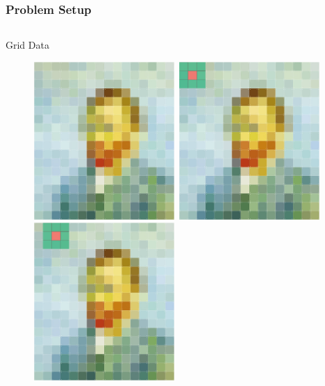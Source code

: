 \documentclass[aspectratio=169]{beamer}
\begin{document}
\begin{frame}[t]
    \frametitle{Problem Setup}
    \begin{columns} %
        \begin{column}{.48\textwidth}
            \begin{minipage}[c][.9\textheight][c]{.98\textwidth}
                \begin{center}    
                    \vskip0.25cm
                    Grid Data
                    \vskip0.05cm
                    \begin{figure}
                        \begin{overprint}
                        \centering \includegraphics[width=5.4cm, height=6cm]{img/van_gogh.jpg}
                        \centering \includegraphics[width=5.4cm, height=6cm]{img/van_gogh_1.jpg}
                        \centering \includegraphics[width=5.4cm, height=6cm]{img/van_gogh_2.jpg}

\end{overprint}
\end{figure}
\end{center}
\end{minipage}
\end{column}
\end{columns}
\end{frame}
\end{document}
